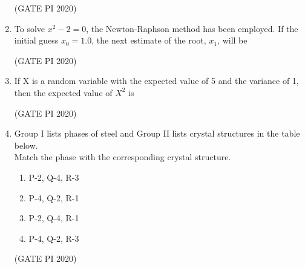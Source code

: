 \documentclass[journal,12pt,onecolumn]{IEEEtran}
\theoremstyle{remark}
\begin{document}
\begin{enumerate}
\hfill (GATE PI 2020)

\item To solve $x^{2} - 2 = 0$, the Newton-Raphson method has been employed. If the initial guess $x_0 = 1.0$, the next estimate of the root, $x_1$, will be
\begin{enumerate}
\end{enumerate}

\hfill (GATE PI 2020)

\item If X is a random variable with the expected value of 5 and the variance of 1, then the expected value of $X^2$ is
\begin{enumerate}
\end{enumerate}

\hfill (GATE PI 2020)

\item Group I lists phases of steel and Group II lists crystal structures in the table below. \\




Match the phase with the corresponding crystal structure.
\begin{enumerate}
    \item P-2, Q-4, R-3
    \item P-4, Q-2, R-1
    \item P-2, Q-4, R-1
    \item P-4, Q-2, R-3
\end{enumerate}

\hfill (GATE PI 2020)


\end{enumerate}
\end{document}
